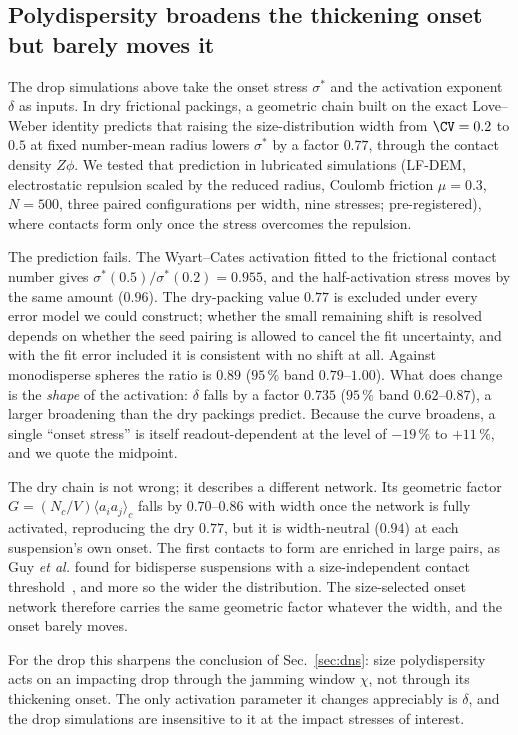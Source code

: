 
\subsection{Polydispersity broadens the thickening onset but barely moves it}

The drop simulations above take the onset stress $\sigma^*$ and the activation exponent $\delta$ as inputs. In dry frictional
packings, a geometric chain built on the exact Love--Weber identity predicts that raising the size-distribution width from
$\CV=0.2$ to $0.5$ at fixed number-mean radius lowers $\sigma^*$ by a factor $0.77$, through the contact density $Z\phi$.
We tested that prediction in lubricated simulations (LF-DEM, electrostatic repulsion scaled by the reduced radius, Coulomb
friction $\mu=0.3$, $N=500$, three paired configurations per width, nine stresses; pre-registered), where contacts form only
once the stress overcomes the repulsion.

The prediction fails. The Wyart--Cates activation fitted to the frictional contact number gives
$\sigma^*(0.5)/\sigma^*(0.2)=0.955$, and the half-activation stress moves by the same amount ($0.96$). The dry-packing
value $0.77$ is excluded under every error model we could construct; whether the small remaining shift is resolved depends
on whether the seed pairing is allowed to cancel the fit uncertainty, and with the fit error included it is consistent with
no shift at all. Against monodisperse spheres the ratio is $0.89$ ($95\,\%$ band $0.79$--$1.00$). What does change is the
\emph{shape} of the activation: $\delta$ falls by a factor $0.735$ ($95\,\%$ band $0.62$--$0.87$), a larger broadening than
the dry packings predict. Because the curve broadens, a single ``onset stress'' is itself readout-dependent at the level of
$-19\,\%$ to $+11\,\%$, and we quote the midpoint.

The dry chain is not wrong; it describes a different network. Its geometric factor $G=(N_c/V)\langle a_ia_j\rangle_c$ falls
by $0.70$--$0.86$ with width once the network is fully activated, reproducing the dry $0.77$, but it is width-neutral
($0.94$) at each suspension's own onset. The first contacts to form are enriched in large pairs, as Guy \emph{et al.} found
for bidisperse suspensions with a size-independent contact threshold~\cite{guy2020testing}, and more so the wider the
distribution. The size-selected onset network therefore carries the same geometric factor whatever the width, and the
onset barely moves.

For the drop this sharpens the conclusion of Sec.~\ref{sec:dns}: size polydispersity acts on an impacting drop through the
jamming window $\chi$, not through its thickening onset. The only activation parameter it changes appreciably is $\delta$,
and the drop simulations are insensitive to it at the impact stresses of interest.
